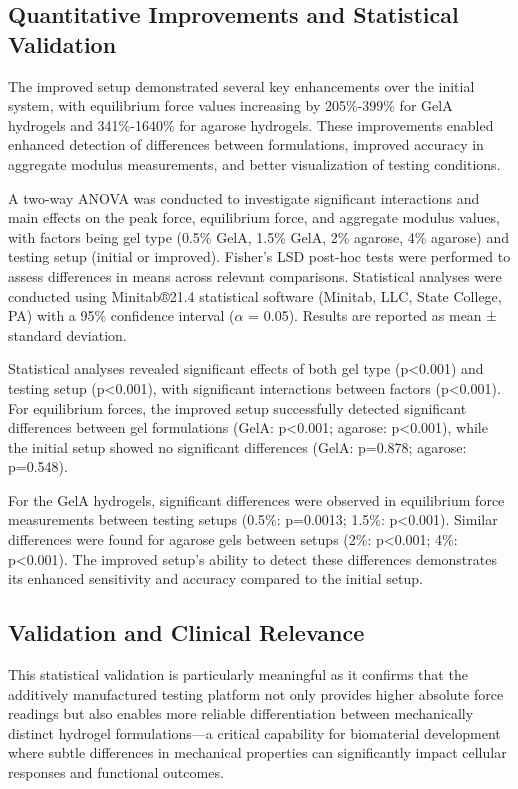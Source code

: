 \subsection{Quantitative Improvements and Statistical Validation}

The improved setup demonstrated several key enhancements over the initial system, with equilibrium force values increasing by 205\%-399\% for GelA hydrogels and 341\%-1640\% for agarose hydrogels. These improvements enabled enhanced detection of differences between formulations, improved accuracy in aggregate modulus measurements, and better visualization of testing conditions.

A two-way ANOVA was conducted to investigate significant interactions and main effects on the peak force, equilibrium force, and aggregate modulus values, with factors being gel type (0.5\% GelA, 1.5\% GelA, 2\% agarose, 4\% agarose) and testing setup (initial or improved). Fisher's LSD post-hoc tests were performed to assess differences in means across relevant comparisons. Statistical analyses were conducted using Minitab®21.4 statistical software (Minitab, LLC, State College, PA) with a 95\% confidence interval ($\alpha$ = 0.05). Results are reported as mean ± standard deviation.

Statistical analyses revealed significant effects of both gel type (p<0.001) and testing setup (p<0.001), with significant interactions between factors (p<0.001). For equilibrium forces, the improved setup successfully detected significant differences between gel formulations (GelA: p<0.001; agarose: p<0.001), while the initial setup showed no significant differences (GelA: p=0.878; agarose: p=0.548).

For the GelA hydrogels, significant differences were observed in equilibrium force measurements between testing setups (0.5\%: p=0.0013; 1.5\%: p<0.001). Similar differences were found for agarose gels between setups (2\%: p<0.001; 4\%: p<0.001). The improved setup's ability to detect these differences demonstrates its enhanced sensitivity and accuracy compared to the initial setup.

\subsection{Validation and Clinical Relevance}

This statistical validation is particularly meaningful as it confirms that the additively manufactured testing platform not only provides higher absolute force readings but also enables more reliable differentiation between mechanically distinct hydrogel formulations—a critical capability for biomaterial development where subtle differences in mechanical properties can significantly impact cellular responses and functional outcomes.

